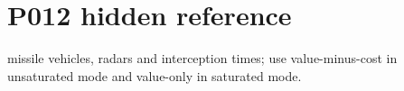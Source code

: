 \section*{P012 hidden reference}\nAssign missile vehicles, radars and interception times; use value-minus-cost in unsaturated mode and value-only in saturated mode.\n